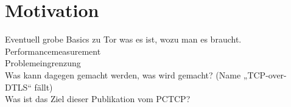 \section{Motivation}
Eventuell grobe Basics zu Tor was es ist, wozu man es braucht.\\
Performancemeasurement\\
Problemeingrenzung\\
Was kann dagegen gemacht werden, was wird gemacht? (Name „TCP-over-DTLS“ fällt)\\
Was ist das Ziel dieser Publikation vom PCTCP? \\
